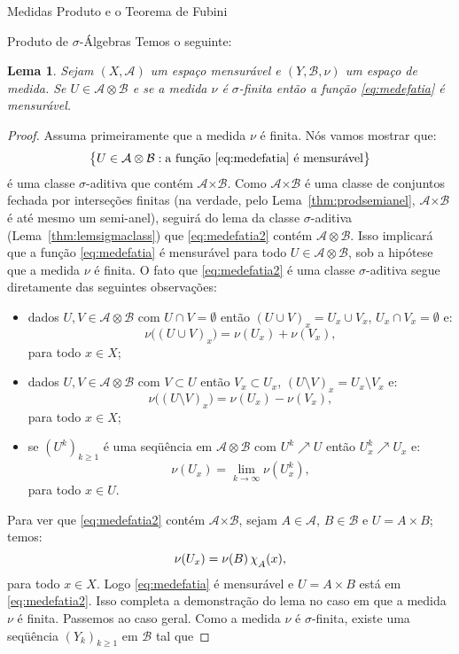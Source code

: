 \documentclass[oneside,final,11pt]{amsbook}
\newcommand{\Times}{\pmb{\times}}
\newcommand{\chilow}[1]{\chi_{\lower2pt\hbox{$\scriptstyle#1$}}}
\theoremstyle{remark}\newtheorem{exercise}{Exercício}[chapter]
\theoremstyle{remark}\newtheorem{*exercise}[exercise]{\hbox to 0pt{\hskip 0pt minus 1fil*}Exercício}
\theoremstyle{definition}\newtheorem{exdefin}{Definição}[chapter]
\theoremstyle{plain}\newtheorem{teo}{Teorema}[section]
\theoremstyle{plain}\newtheorem{lem}[teo]{Lema}
\theoremstyle{plain}\newtheorem{prop}[teo]{Proposição}
\theoremstyle{plain}\newtheorem{cor}[teo]{Corolário}
\theoremstyle{definition}\newtheorem{defin}[teo]{Definição}
\theoremstyle{remark}\newtheorem{rem}[teo]{Observação}
\theoremstyle{definition}\newtheorem{notation}[teo]{Notação}
\theoremstyle{definition}\newtheorem{convention}[teo]{Convenção}
\theoremstyle{definition}\newtheorem{example}[teo]{Exemplo}
\numberwithin{section}{chapter}
\numberwithin{equation}{section}
\begin{document}
\begin{chapter}{Medidas Produto e o Teorema de Fubini}
\begin{section}{Produto de ${\sigma}$-Álgebras}
Temos o seguinte:
\begin{lem}\label{thm:medefatiasmens}
Sejam $(X,\mathcal A)$ um espaço mensurável e $(Y,\mathcal B,\nu)$ um espaço de medida. Se $U\in\mathcal A\otimes\mathcal B$
e se a medida $\nu$ é $\sigma$-finita então a função \eqref{eq:medefatia} é mensurável.
\end{lem}
\begin{proof}
Assuma primeiramente que a medida $\nu$ é finita. Nós vamos mostrar que:
\begin{equation}\label{eq:medefatia2}
\big\{U\in\mathcal A\otimes\mathcal B:\text{a função \eqref{eq:medefatia} é mensurável}\big\}
\end{equation}
é uma classe $\sigma$-aditiva que contém $\mathcal A\Times\mathcal B$. Como $\mathcal A\Times\mathcal B$
é uma classe de conjuntos fechada por interseções finitas (na verdade, pelo Lema~\ref{thm:prodsemianel}, $\mathcal A\Times\mathcal B$
é até mesmo um semi-anel), seguirá do lema da classe $\sigma$-aditiva (Lema~\ref{thm:lemsigmaclass}) que
\eqref{eq:medefatia2} contém $\mathcal A\otimes\mathcal B$. Isso implicará que a função \eqref{eq:medefatia} é mensurável
para todo $U\in\mathcal A\otimes\mathcal B$, sob a hipótese que a medida $\nu$ é finita.
O fato que \eqref{eq:medefatia2} é uma classe $\sigma$-aditiva segue diretamente das seguintes observações:
\begin{itemize}
\item dados $U,V\in\mathcal A\otimes\mathcal B$ com $U\cap V=\emptyset$ então $(U\cup V)_x=U_x\cup V_x$,
$U_x\cap V_x=\emptyset$ e:
\[\nu\big((U\cup V)_x\big)=\nu(U_x)+\nu(V_x),\]
para todo $x\in X$;
\item dados $U,V\in\mathcal A\otimes\mathcal B$ com $V\subset U$ então $V_x\subset U_x$, $(U\setminus V)_x=U_x\setminus V_x$
e:
\[\nu\big((U\setminus V)_x\big)=\nu(U_x)-\nu(V_x),\]
para todo $x\in X$;
\item se $(U^k)_{k\ge1}$ é uma seqüência em $\mathcal A\otimes\mathcal B$ com $U^k\nearrow U$ então
$U^k_x\nearrow U_x$ e:
\[\nu(U_x)=\lim_{k\to\infty}\nu(U^k_x),\]
para todo $x\in U$.
\end{itemize}
Para ver que \eqref{eq:medefatia2} contém $\mathcal A\Times\mathcal B$, sejam $A\in\mathcal A$, $B\in\mathcal B$ e
$U=A\times B$; temos:
\[\nu(U_x)=\nu(B)\,\chilow A(x),\]
para todo $x\in X$. Logo \eqref{eq:medefatia} é mensurável e $U=A\times B$ está em \eqref{eq:medefatia2}.
Isso completa a demonstração do lema no caso em que a medida $\nu$ é finita. Passemos ao caso geral.
Como a medida $\nu$ é $\sigma$-finita, existe uma seqüência $(Y_k)_{k\ge1}$ em $\mathcal B$ tal que

\end{proof}
\end{section}
\end{chapter}
\end{document}

